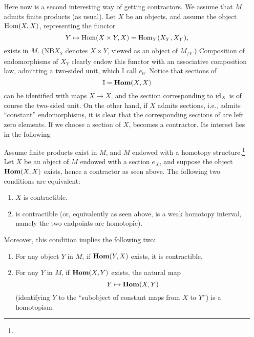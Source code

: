 Here now is a second interesting way of getting contractors. We assume
that $M$ admits finite products (as usual). Let $X$ be an objects, and
assume the object $\operatorname{Hom}(X,X)$, representing the functor
\[Y \mapsto \operatorname{Hom}(X\times Y,X) = \operatorname{Hom}_Y(X_Y,X_Y),\]
exists in $M$. (NB\enspace $X_Y$ denotes $X\times Y$, viewed as an object of
$M_{/Y}$.) Composition of endomorphisms of $X_Y$ clearly endow this
functor with an associative composition law, admitting a two-sided
unit, which I call $e_0$. Notice that sections of
\[{\mathbb{I}}=\operatorname{\mathbf{Hom}}(X,X)\]
can be identified with maps $X\to X$, and the section corresponding to
$\operatorname{id}_X$ is of course the two-sided unit. On the other hand, if $X$
admits sections, i.e., admits ``constant'' endomorphisms, it is
clear that the corresponding sections of \bI{} are left zero
elements. If we choose a section of $X$, \bI{} becomes a
contractor. Its interest lies in the following
\begin{proposition}
  Assume finite products exist in $M$, and $M$ endowed with a homotopy
  structure.\footnote{} Let $X$ be an object of $M$ endowed with a
  section $e_X$, and suppose the object $\operatorname{\mathbf{Hom}}(X,X)$ exists, hence a
  contractor \bI{} as seen above. The following two conditions are
  equivalent:
  \begin{enumerate}[label=\alph*),font=\normalfont]
  \item\label{it:51.E.a}
    $X$ is contractible.
  \item\label{it:51.E.b}
    \bI{} is contractible \textup(or, equivalently as seen above,
    \bI{} is a weak homotopy interval, namely the two endpoints are homotopic\textup).
  \end{enumerate}
  Moreover, this condition implies the following two:
  \begin{enumerate}[label=\alph*),font=\normalfont,resume]
  \item\label{it:51.E.c}
    For any object $Y$ in $M$, if $\operatorname{\mathbf{Hom}}(Y,X)$ exists, it is contractible.
  \item\label{it:51.E.d}
    For any $Y$ in $M$, if $\operatorname{\mathbf{Hom}}(X,Y)$ exists, the natural map
    \[ Y \mapsto \operatorname{\mathbf{Hom}}(X,Y)\]
    \textup(identifying $Y$ to the ``subobject of constant maps from
    $X$ to $Y$''\textup) is a homotopism.
  \end{enumerate}
\end{proposition}

